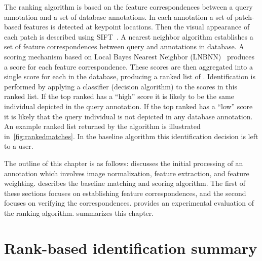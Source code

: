     The ranking algorithm is based on the feature correspondences between a
      query annotation and a set of database annotations.
    In each annotation a set of patch-based features is detected at keypoint
      locations.
    Then the visual appearance of each patch is described using
      SIFT~\cite{lowe_distinctive_2004}.
    A nearest neighbor algorithm establishes a set of feature correspondences
      between query and annotations in database.
    A scoring mechanism based on Local \Naive{} Bayes Nearest Neighbor
      (LNBNN)~\cite{mccann_local_2012} produces a score for each feature
      correspondence.
    These scores are then aggregated into a single score for each \name{} in
      the database, producing a ranked list of \names{}.
    Identification is performed by applying a classifier (decision algorithm)
      to the scores in this ranked list.
    If the top ranked \name{} has a ``high'' score it is likely to be the same
      individual depicted in the query annotation.
    If the top ranked \name{} has a ``low'' score it is likely that the query
      individual is not depicted in any database annotation.
    An example ranked list returned by the algorithm is illustrated
      in~\cref{fig:rankedmatches}.
    In the baseline algorithm this identification decision is left to a user.

    The outline of this chapter is as follows:
     discusses the initial processing of an annotation
      which involves image normalization, feature extraction, and feature
      weighting.
     describes the baseline matching and
      scoring algorithm.
    The first of these sections focuses on establishing feature
      correspondences, and the second focuses on verifying the correspondences.
     provides an experimental evaluation of the ranking
      algorithm.
     summarizes this chapter.

    \rankedmatches{}

    
    
    
    



\section{Rank-based identification summary}\label{sec:staticsum}

